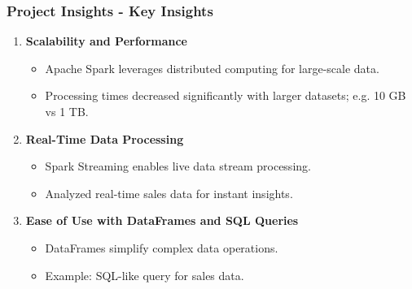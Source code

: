 \documentclass[aspectratio=169]{beamer}
\begin{document}
\begin{frame}[fragile]
    \frametitle{Project Insights - Key Insights}
    \begin{enumerate}
        \item \textbf{Scalability and Performance}
        \begin{itemize}
            \item Apache Spark leverages distributed computing for large-scale data.
            \item Processing times decreased significantly with larger datasets; e.g. 10 GB vs 1 TB.
        \end{itemize}
        
        \item \textbf{Real-Time Data Processing}
        \begin{itemize}
            \item Spark Streaming enables live data stream processing.
            \item Analyzed real-time sales data for instant insights.
        \end{itemize}
        
        \item \textbf{Ease of Use with DataFrames and SQL Queries}
        \begin{itemize}
            \item DataFrames simplify complex data operations.
            \item Example: SQL-like query for sales data.
        \end{itemize}
    \end{enumerate}
\end{frame}
\end{document}
